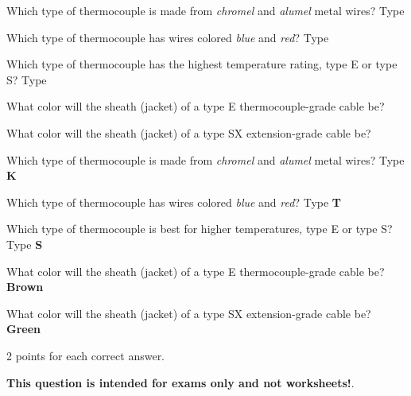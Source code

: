 

Which type of thermocouple is made from {\it chromel} and {\it alumel} metal wires?  Type \underbar{\hskip 50pt}

\vskip 10pt

Which type of thermocouple has wires colored {\it blue} and {\it red}?  Type \underbar{\hskip 50pt}

\vskip 10pt

Which type of thermocouple has the highest temperature rating, type E or type S?  Type \underbar{\hskip 50pt}

\vskip 10pt

What color will the sheath (jacket) of a type E thermocouple-grade cable be? \underbar{\hskip 50pt}

\vskip 10pt

What color will the sheath (jacket) of a type SX extension-grade cable be? \underbar{\hskip 50pt}







Which type of thermocouple is made from {\it chromel} and {\it alumel} metal wires?  Type {\bf K}

\vskip 10pt

Which type of thermocouple has wires colored {\it blue} and {\it red}?  Type {\bf T}

\vskip 10pt

Which type of thermocouple is best for higher temperatures, type E or type S?  Type {\bf S}

\vskip 10pt

What color will the sheath (jacket) of a type E thermocouple-grade cable be? {\bf Brown}

\vskip 10pt

What color will the sheath (jacket) of a type SX extension-grade cable be? {\bf Green}

\vskip 10pt

2 points for each correct answer.







{\bf This question is intended for exams only and not worksheets!}.




